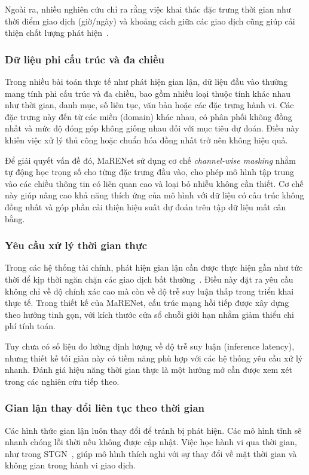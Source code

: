 Ngoài ra, nhiều nghiên cứu chỉ ra rằng việc khai thác đặc trưng thời gian như thời điểm giao dịch (giờ/ngày) và khoảng cách giữa các giao dịch cũng giúp cải thiện chất lượng phát hiện~\cite{bahnsen2016feature, liu2020adaptive}.

\subsubsection{Dữ liệu phi cấu trúc và đa chiều}

Trong nhiều bài toán thực tế như phát hiện gian lận, dữ liệu đầu vào thường mang tính phi cấu trúc và đa chiều, bao gồm nhiều loại thuộc tính khác nhau như thời gian, danh mục, số liên tục, văn bản hoặc các đặc trưng hành vi. Các đặc trưng này đến từ các miền (domain) khác nhau, có phân phối không đồng nhất và mức độ đóng góp không giống nhau đối với mục tiêu dự đoán. Điều này khiến việc xử lý thủ công hoặc chuẩn hóa đồng nhất trở nên không hiệu quả.

Để giải quyết vấn đề đó, MaRENet sử dụng cơ chế \textit{channel-wise masking} nhằm tự động học trọng số cho từng đặc trưng đầu vào, cho phép mô hình tập trung vào các chiều thông tin có liên quan cao và loại bỏ nhiễu không cần thiết. Cơ chế này giúp nâng cao khả năng thích ứng của mô hình với dữ liệu có cấu trúc không đồng nhất và góp phần cải thiện hiệu suất dự đoán trên tập dữ liệu mất cân bằng.

\subsubsection{Yêu cầu xử lý thời gian thực}

Trong các hệ thống tài chính, phát hiện gian lận cần được thực hiện gần như tức thời để kịp thời ngăn chặn các giao dịch bất thường~\cite{fiore2019using}. Điều này đặt ra yêu cầu không chỉ về độ chính xác cao mà còn về độ trễ suy luận thấp trong triển khai thực tế. Trong thiết kế của MaRENet, cấu trúc mạng hồi tiếp được xây dựng theo hướng tinh gọn, với kích thước cửa sổ chuỗi giới hạn nhằm giảm thiểu chi phí tính toán.  

Tuy chưa có số liệu đo lường định lượng về độ trễ suy luận (inference latency), nhưng thiết kế tối giản này có tiềm năng phù hợp với các hệ thống yêu cầu xử lý nhanh. Đánh giá hiệu năng thời gian thực là một hướng mở cần được xem xét trong các nghiên cứu tiếp theo.

\subsubsection{Gian lận thay đổi liên tục theo thời gian}
Các hình thức gian lận luôn thay đổi để tránh bị phát hiện. Các mô hình tĩnh sẽ nhanh chóng lỗi thời nếu không được cập nhật. Việc học hành vi qua thời gian, như trong STGN~\cite{xie2024stgn}, giúp mô hình thích nghi với sự thay đổi về mặt thời gian và không gian trong hành vi giao dịch.

